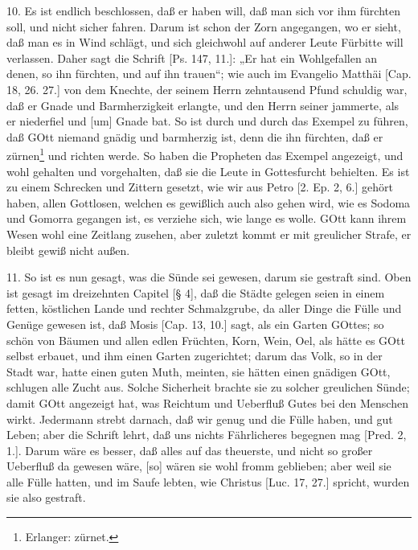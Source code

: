 10. Es ist endlich beschlossen, daß er haben will, daß man sich vor ihm fürchten soll, und nicht sicher fahren. Darum ist schon der Zorn angegangen, wo er sieht, daß man es in Wind schlägt, und sich gleichwohl auf anderer Leute Fürbitte will verlassen. Daher sagt die Schrift [Ps. 147, 11.]: „Er hat ein Wohlgefallen an denen, so ihn fürchten, und auf ihn trauen“; wie auch im Evangelio Matthäi [Cap. 18, 26. 27.] von dem Knechte, der seinem Herrn zehntausend Pfund schuldig war, daß er Gnade und Barmherzigkeit erlangte, und den Herrn seiner jammerte, als er niederfiel und [um] Gnade bat. So ist durch und durch das Exempel zu führen, daß GOtt niemand gnädig und barmherzig ist, denn die ihn fürchten, daß er zürnen\footnote{Erlanger: zürnet.} und richten werde. So haben die Propheten das Exempel angezeigt, und wohl gehalten und vorgehalten, daß sie die Leute in Gottesfurcht behielten. Es ist zu einem Schrecken und Zittern gesetzt, wie wir aus Petro [2. Ep. 2, 6.] gehört haben, allen Gottlosen, welchen es gewißlich auch also gehen wird, wie es Sodoma und Gomorra gegangen ist, es verziehe sich, wie lange es wolle. GOtt kann ihrem Wesen wohl eine Zeitlang zusehen, aber zuletzt kommt er mit greulicher Strafe, er bleibt gewiß nicht außen.

11. So ist es nun gesagt, was die Sünde sei gewesen, darum sie gestraft sind. Oben ist gesagt im dreizehnten Capitel [§ 4], daß die Städte gelegen seien in einem fetten, köstlichen Lande und rechter Schmalzgrube, da aller Dinge die Fülle und Genüge gewesen ist, daß Mosis [Cap. 13, 10.] sagt, als ein Garten GOttes; so schön von Bäumen und allen edlen Früchten, Korn, Wein, Oel, als hätte es GOtt selbst erbauet, und ihm einen Garten zugerichtet; darum das Volk, so in der Stadt war, hatte einen guten Muth, meinten, sie hätten einen gnädigen GOtt, schlugen alle Zucht aus. Solche Sicherheit brachte sie zu solcher greulichen Sünde; damit GOtt angezeigt hat, was Reichtum und Ueberfluß Gutes bei den Menschen wirkt. Jedermann strebt darnach, daß wir genug und die Fülle haben, und gut Leben; aber die Schrift lehrt, daß uns nichts Fährlicheres begegnen mag [Pred. 2, 1.]. Darum wäre es besser, daß alles auf das theuerste, und nicht so großer Ueberfluß da gewesen wäre, [so] wären sie wohl fromm geblieben; aber weil sie alle Fülle hatten, und im Saufe lebten, wie Christus [Luc. 17, 27.] spricht, wurden sie also gestraft.

